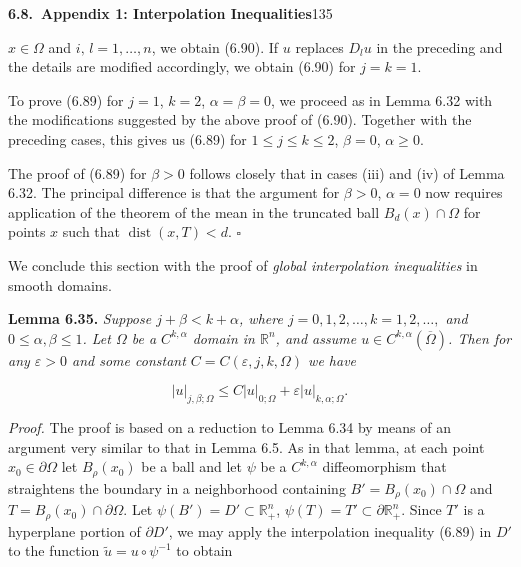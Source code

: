 
\pagestyle{empty}


\setcounter{section}{6}
\noindent\textbf{6.8.\ Appendix 1: Interpolation Inequalities}\hfill 135

\medskip

$x \in \Omega$ and $i,\, l = 1, \dots, n$, we obtain (6.90). If $u$ replaces $D_l u$ in the preceding and the details are modified accordingly, we obtain (6.90) for $j = k = 1$.

To prove (6.89) for $j = 1$, $k = 2$, $\alpha = \beta = 0$, we proceed as in Lemma 6.32 with the modifications suggested by the above proof of (6.90). Together with the preceding cases, this gives us (6.89) for $1 \leq j \leq k \leq 2$, $\beta = 0$, $\alpha \geq 0$.

The proof of (6.89) for $\beta > 0$ follows closely that in cases (iii) and (iv) of Lemma 6.32. The principal difference is that the argument for $\beta > 0$, $\alpha = 0$ now requires application of the theorem of the mean in the truncated ball $B_d(x)\cap \Omega$ for points $x$ such that $\operatorname{dist}(x,T) < d$. \hfill $\square$

\medskip

\noindent We conclude this section with the proof of \emph{global interpolation inequalities} in smooth domains.

\medskip

\noindent\textbf{Lemma 6.35.} \emph{Suppose $j+\beta < k+\alpha$, where $j = 0, 1, 2, \dots, k = 1, 2, \dots,$ and $0 \leq \alpha, \beta \leq 1$. Let $\Omega$ be a $C^{k,\alpha}$ domain in $\mathbb{R}^n$, and assume $u \in C^{k,\alpha}(\overline{\Omega})$. Then for any $\varepsilon > 0$ and some constant $C = C(\varepsilon, j, k, \Omega)$ we have}

\begin{equation}\tag{6.91}
|u|_{j,\beta;\Omega} \leq C|u|_{0;\Omega} + \varepsilon |u|_{k,\alpha;\Omega}.
\end{equation}

\noindent\emph{Proof.} The proof is based on a reduction to Lemma 6.34 by means of an argument very similar to that in Lemma 6.5. As in that lemma, at each point $x_0 \in \partial\Omega$ let $B_\rho(x_0)$ be a ball and let $\psi$ be a $C^{k,\alpha}$ diffeomorphism that straightens the boundary in a neighborhood containing $B' = B_\rho(x_0)\cap\Omega$ and $T = B_\rho(x_0)\cap\partial\Omega$. Let $\psi(B') = D' \subset \mathbb{R}_+^n$, $\psi(T) = T' \subset \partial\mathbb{R}_+^n$. Since $T'$ is a hyperplane portion of $\partial D'$, we may apply the interpolation inequality (6.89) in $D'$ to the function $\tilde{u} = u \circ \psi^{-1}$ to obtain

